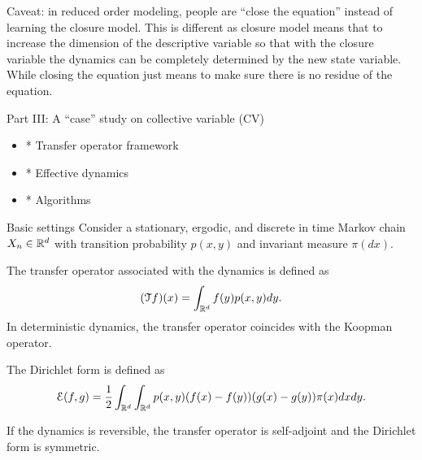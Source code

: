 \documentclass{beamer}
\begin{document}
\begin{frame}
	Caveat: in reduced order modeling, people are ``close the equation'' instead of 
	learning the closure model. This is different as closure model means that to
	increase the dimension of the descriptive variable so that with the closure
	variable the dynamics can be completely determined by the new state variable.
	While closing the equation just means to make sure there is no residue of the
	equation.
\end{frame}

\begin{frame}{Part III: A ``case'' study on collective variable (CV)\footnotemark}
	\begin{itemize}
		\item * Transfer operator framework
		\item * Effective dynamics
		\item * Algorithms
	\end{itemize}
\end{frame}

\begin{frame}{Basic settings}
	Consider a stationary, ergodic, and discrete in time Markov chain $X_n \in \mathbb{R}^d$
	with transition probability $p(x, y)$ and invariant measure $\pi(dx)$. 

	The transfer operator associated with the dynamics is defined as 
	\begin{equation*}
		(\mathcal{T} f)(x) = \int_{\mathbb{R}^d} f(y)p(x, y)dy.
	\end{equation*}
	In deterministic dynamics, the transfer operator coincides with the Koopman operator.

	The Dirichlet form is defined as 
	\begin{equation*}
		\mathcal{E}(f, g)= \frac{1}{2} \int_{\mathbb{R}^d}\int_{\mathbb{R}^d}p(x, y)(f(x) - f(y))
			(g(x) - g(y))\pi(x)dxdy.
	\end{equation*}

	If the dynamics is reversible, the transfer operator is self-adjoint and the
	Dirichlet form is symmetric.
\end{frame}
\end{document}
